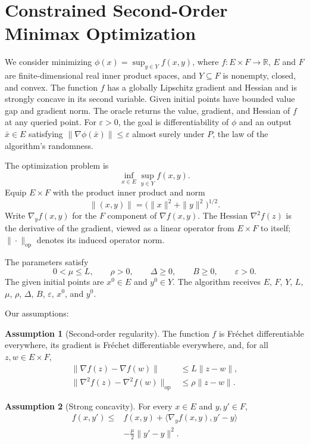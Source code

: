 \documentclass[10pt]{article}
\theoremstyle{definition}
\newtheorem{assumption}{Assumption}
\begin{document}
\section*{Constrained Second-Order Minimax Optimization}
We consider minimizing $\phi(x)=\sup_{y\in Y}f(x,y)$, where $f:E\times F\to\mathbb{R}$, $E$ and $F$ are finite-dimensional real inner product spaces, and $Y\subseteq F$ is nonempty, closed, and convex. The function $f$ has a globally Lipschitz gradient and Hessian and is strongly concave in its second variable. Given initial points have bounded value gap and gradient norm. The oracle returns the value, gradient, and Hessian of $f$ at any queried point. For $\varepsilon>0$, the goal is differentiability of $\phi$ and an output $\bar{x}\in E$ satisfying $\|\nabla\phi(\bar{x})\|\leq\varepsilon$ almost surely under $P$, the law of the algorithm's randomness.

The optimization problem is
\[
\inf_{x\in E}\sup_{y\in Y} f(x,y).
\]
Equip $E\times F$ with the product inner product and norm
\[
\|(x,y)\|=\bigl(\|x\|^2+\|y\|^2\bigr)^{1/2}.
\]
Write $\nabla_y f(x,y)$ for the $F$ component of $\nabla f(x,y)$. The Hessian $\nabla^2 f(z)$ is the derivative of the gradient, viewed as a linear operator from $E\times F$ to itself; $\|\cdot\|_{\mathrm{op}}$ denotes its induced operator norm.

The parameters satisfy
\[
0<\mu\leq L,\qquad \rho>0,\qquad
\Delta\geq0,\qquad B\geq0,\qquad \varepsilon>0.
\]
The given initial points are $x^0\in E$ and $y^0\in Y$. The algorithm receives $E$, $F$, $Y$, $L$, $\mu$, $\rho$, $\Delta$, $B$, $\varepsilon$, $x^0$, and $y^0$.

Our assumptions:
\begin{assumption}[Second-order regularity]
The function $f$ is Fr\'echet differentiable everywhere, its gradient is Fr\'echet differentiable everywhere, and, for all $z,w\in E\times F$,
\[
\begin{aligned}
\|\nabla f(z)-\nabla f(w)\|
&\leq L\|z-w\|,\\
\|\nabla^2 f(z)-\nabla^2 f(w)\|_{\mathrm{op}}
&\leq\rho\|z-w\|.
\end{aligned}
\]
\end{assumption}

\begin{assumption}[Strong concavity]
For every $x\in E$ and $y,y'\in F$,
\[
\begin{aligned}
f(x,y')\leq{}&f(x,y)
+\langle\nabla_y f(x,y),y'-y\rangle\\
&-\frac{\mu}{2}\|y'-y\|^2.
\end{aligned}
\]
\end{assumption}
\end{document}
